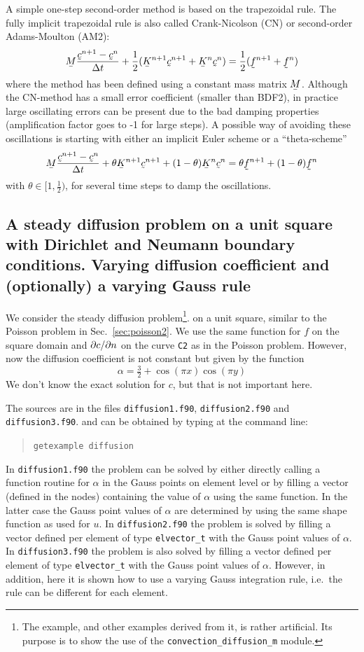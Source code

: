 A simple one-step second-order method is based on the trapezoidal rule. 
The fully implicit trapezoidal rule is also called Crank-Nicolson (CN) or second-order Adams-Moulton (AM2):
\[
 \mat M\frac{\col c^{n+1}-\col{c}^n}{\Delta t}+
\frac12(\mat K^{n+1}\col c^{n+1}+
\mat K^{n}\col c^{n})=\frac12( \col f^{n+1}+ \col f^{n})
\]
where the method has been defined using a constant mass matrix $\mat M$.
Although the CN-method has a small error coefficient (smaller than BDF2),
in practice large
oscillating errors can be present due to the bad damping properties
(amplification factor goes to -1 for large steps). A possible way of avoiding
these oscillations is starting with either an implicit Euler scheme
or a ``theta-scheme''
\[
 \mat M\frac{\col c^{n+1}-\col{c}^n}{\Delta t}+
\theta\mat K^{n+1}\col c^{n+1}+
(1-\theta)\mat K^{n}\col c^{n}=\theta\col f^{n+1}+ (1-\theta) \col f^{n}
\]
with $\theta\in[1,\frac12)$,
for several time steps to damp the oscillations.

\subsection{A steady diffusion problem on a unit square with Dirichlet
            and Neumann boundary conditions. Varying diffusion coefficient and
            (optionally) a varying Gauss rule}

\label{sec:diffusion1}

We consider the steady
diffusion problem\footnote{The example, and other examples derived from it,
is rather artificial. Its purpose is to show the use of the 
\texttt{convection\_diffusion\_m} module.}.
 on a unit square, similar to the Poisson
problem in Sec.~\ref{sec:poisson2}. We use the same function for $f$ on the
square domain and $\partial c/\partial n$ on the
curve \texttt{C2} as in the Poisson problem. However, now the diffusion
coefficient is not constant but given by the function
\begin{equation}
     \alpha=\tfrac32+\cos(\pi x)\cos(\pi y)
\end{equation}
We don't know the exact solution for $c$, but that is not important here.

The sources are
in the files \texttt{diffusion1.f90}, \texttt{diffusion2.f90} and
\texttt{diffusion3.f90}.
 and can be obtained by typing at the
command line:
\begin{quote}
   \texttt{getexample diffusion}
\end{quote}
In \texttt{diffusion1.f90} the problem can be solved by
either directly calling a function routine for $\alpha$ in the Gauss points
 on element level or by filling a vector (defined in the nodes) containing
the value of $\alpha$ using the same function. In the latter case the Gauss
point values of $\alpha$ are determined by using the same shape function as
used for $u$.
In \texttt{diffusion2.f90} the problem is solved by filling a vector defined
per element of type \texttt{elvector\_t} with the Gauss point values of
$\alpha$.
In \texttt{diffusion3.f90} the problem is also
solved by filling a vector defined
per element of type \texttt{elvector\_t} with the Gauss point values of
$\alpha$. However, in addition, here it is shown how to use a varying
Gauss integration rule, i.e.\ the rule can be different for each element.

